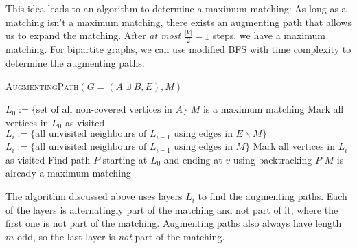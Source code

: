 This idea leads to an algorithm to determine a maximum matching: As long as a matching isn't a maximum matching, there exists an augmenting path that allows us to expand the matching. After \textit{at most} $\frac{|V|}{2} - 1$ steps, we have a maximum matching. For bipartite graphs, we can use modified BFS with time complexity  to determine the augmenting paths.
\begin{algorithm}
    \caption{\textsc{AugmentingPath}$(G = (A \uplus B, E), M)$}
    \begin{algorithmic}[1]
        \State $L_0 := \{ \text{set of all non-covered vertices in $A$} \}$
            \State \Return $M$ is a maximum matching
        \EndIf
        \State Mark all vertices in $L_0$ as visited
             
                \State $L_i := \{\text{all unvisited neighbours of $L_{i - 1}$ using edges in } E \backslash M\}$
            \Else
                \State $L_i := \{\text{all unvisited neighbours of $L_{i - 1}$ using edges in } M\}$
            \EndIf
            \State Mark all vertices in $L_i$ as visited 
                \State Find path $P$ starting at $L_0$ and ending at $v$ using backtracking
                \State \Return $P$
            \EndIf
        \EndFor
        \State \Return $M$ is already a maximum matching
    \end{algorithmic}
\end{algorithm}
\begin{center}
\end{center}
The algorithm discussed above uses layers $L_i$ to find the augmenting paths. Each of the layers is alternatingly part of the matching and not part of it, where the first one is not part of the matching. Augmenting paths also always have length $m$ odd, so the last layer is \textit{not} part of the matching.



